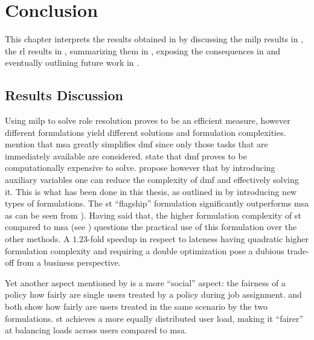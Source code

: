 \chapter{Conclusion}
\label{ch:conclusion}

This chapter interprets the results obtained in  by discussing the \gls{milp} results in , the \gls{rl} results in , summarizing them in , exposing the consequences in  and eventually outlining future work in .

\section{ Results Discussion}
\label{sec:optimization_discussion}

Using \gls{milp} to solve role resolution proves to be an efficient measure, however different formulations yield different solutions and formulation complexities. \citet[p. 15]{Zeng2005} mention that \gls{msa} greatly simplifies \gls{dmf} since only those tasks that are immediately available are considered. \citet{Garey1990} state that \gls{dmf} proves to be computationally expensive to solve. \citet[p. 13]{Zeng2005} propose however that by introducing auxiliary variables one can reduce the complexity of \gls{dmf} and effectively solving it. This is what has been done in this thesis, as outlined in  by introducing new types of formulations. The \gls{st} ``flagship'' formulation significantly outperforms \gls{msa} as can be seen from ). Having said that, the higher formulation complexity of \gls{st} compared to \gls{msa} (see ) questions the practical use of this formulation over the other methods. A $1.23$-fold speedup in respect to lateness having quadratic higher formulation complexity and requiring a double optimization pose a dubious trade-off from a business perspective.


Yet another aspect mentioned by \citet[pp. 17--18]{Zeng2005} is a more ``social'' aspect: the fairness of a policy \ie how fairly are single users treated by a policy during job assignment.  and  both show how fairly are users treated in the same scenario by the two formulations. \gls{st} achieves a more equally distributed user load, making it ``fairer'' at balancing loads across users compared to \gls{msa}.

